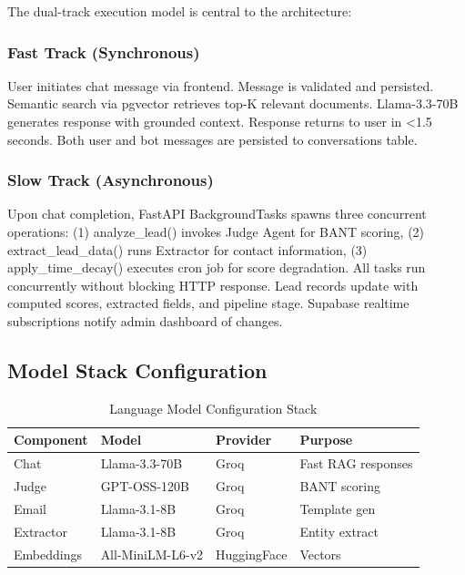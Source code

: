 \documentclass[10pt,twocolumn,a4paper]{article}
\begin{document}
The dual-track execution model is central to the architecture:

\subsubsection{Fast Track (Synchronous)}

User initiates chat message via frontend. Message is validated and persisted. Semantic search via pgvector retrieves top-K relevant documents. Llama-3.3-70B generates response with grounded context. Response returns to user in <1.5 seconds. Both user and bot messages are persisted to conversations table.

\subsubsection{Slow Track (Asynchronous)}

Upon chat completion, FastAPI BackgroundTasks spawns three concurrent operations: (1) analyze\_lead() invokes Judge Agent for BANT scoring, (2) extract\_lead\_data() runs Extractor for contact information, (3) apply\_time\_decay() executes cron job for score degradation. All tasks run concurrently without blocking HTTP response. Lead records update with computed scores, extracted fields, and pipeline stage. Supabase realtime subscriptions notify admin dashboard of changes.

\subsection{Model Stack Configuration}

\begin{table}[H]
\centering
\small
\begin{tabular}{|l|l|l|p{}|}
\hline
\textbf{Component} & \textbf{Model} & \textbf{Provider} & \textbf{Purpose} \\
\hline
Chat & Llama-3.3-70B & Groq & Fast RAG responses \\
\hline
Judge & GPT-OSS-120B & Groq & BANT scoring \\
\hline
Email & Llama-3.1-8B & Groq & Template gen \\
\hline
Extractor & Llama-3.1-8B & Groq & Entity extract \\
\hline
Embeddings & All-MiniLM-L6-v2 & HuggingFace & Vectors \\
\hline
\end{tabular}
\caption{Language Model Configuration Stack}
\label{tab:model_stack}
\end{table}
\end{document}
